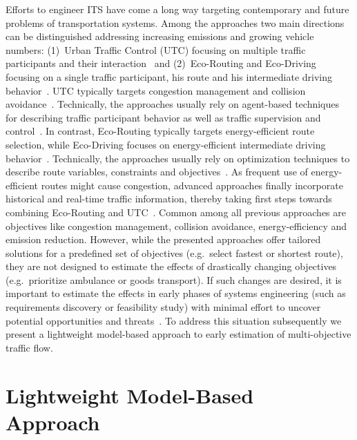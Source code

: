 \documentclass[conference]{../cls/IEEEtran}
\begin{document}
Efforts to engineer ITS have come a long way targeting contemporary and future problems of transportation systems. Among the approaches two main directions can be distinguished addressing increasing emissions and growing vehicle numbers: (1)~Urban Traffic Control (UTC) focusing on multiple traffic participants and their interaction~\cite{Chen2010} and (2)~Eco-Routing and Eco-Driving focusing on a single traffic participant, his route and his intermediate driving behavior~\cite{Ericsson2006,Boriboonsomsin2012}. UTC typically targets congestion management and collision avoidance~\cite{Chen2010}. Technically, the approaches usually rely on agent-based techniques for describing traffic participant behavior as well as traffic supervision and control~\cite{Chen2010}. In contrast, Eco-Routing typically targets energy-efficient route selection, while Eco-Driving focuses on energy-efficient intermediate driving behavior~\cite{Ericsson2006}. Technically, the approaches usually rely on optimization techniques to describe route variables, constraints and objectives~\cite{Ericsson2006}. As frequent use of energy-efficient routes might cause congestion, advanced approaches finally incorporate historical and real-time traffic information, thereby taking first steps towards combining Eco-Routing and UTC~\cite{Boriboonsomsin2012}. Common among all previous approaches are objectives like congestion management, collision avoidance, energy-efficiency and emission reduction. However, while the presented approaches offer tailored solutions for a predefined set of objectives (e.g.\ select fastest or shortest route), they are not designed to estimate the effects of drastically changing objectives (e.g.\ prioritize ambulance or goods transport). If such changes are desired, it is important to estimate the effects in early phases of systems engineering (such as requirements discovery or feasibility study) with minimal effort to uncover potential opportunities and threats~\cite{Whitten2005}. To address this situation subsequently we present a lightweight model-based approach to early estimation of multi-objective traffic flow.

\section{Lightweight Model-Based Approach}
\label{sec:approach}
\end{document}

